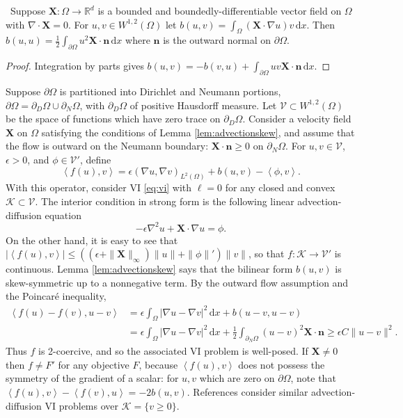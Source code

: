 \documentclass[review,hidelinks,onefignum,onetabnum]{siamart220329}
\newcommand{\eps}{\epsilon}
\newcommand{\RR}{\mathbb{R}}
\newcommand{\grad}{\nabla}
\newcommand{\Div}{\nabla\cdot}
\newcommand{\bn}{\mathbf{n}}
\newcommand{\bX}{\mathbf{X}}
\newcommand{\cK}{\mathcal{K}}
\newcommand{\cV}{\mathcal{V}}
\newcommand{\ip}[2]{\left<#1,#2\right>}
\newcommand{\dx}{\, \mathrm{d}x}
\begin{document}
\begin{lemma}  \label{lem:advectionskew}  \cite{Elmanetal2014}\,  Suppose $\bX :\Omega \to \RR^d$ is a bounded and boundedly-differentiable vector field on $\Omega$ with $\Div \bX=0$.  For $u,v \in W^{1,2}(\Omega)$ let $b(u,v) = \int_\Omega (\bX \cdot \grad u) v\dx$.  Then $b(u,u) = \frac{1}{2} \int_{\partial \Omega} u^2 \bX\cdot \bn\dx$ where $\bn$ is the outward normal on $\partial \Omega$.
\end{lemma}

\begin{proof}
Integration by parts gives $b(u,v) = - b(v,u) + \int_{\partial \Omega} uv \bX\cdot \bn\dx$.
\end{proof}

\begin{example}  \label{ex:advectiondiffusion}  Suppose $\partial\Omega$ is partitioned into Dirichlet and Neumann portions, $\partial\Omega = \partial_D\Omega \cup \partial_N\Omega$, with $\partial_D\Omega$ of positive Hausdorff measure.  Let $\cV \subset W^{1,2}(\Omega)$ be the space of functions which have zero trace on $\partial_D\Omega$.  Consider a velocity field $\bX$ on $\Omega$ satisfying the conditions of Lemma \ref{lem:advectionskew}, and assume that the flow is outward on the Neumann boundary: $\bX \cdot \bn \ge 0$ on $\partial_N\Omega$.  For $u,v \in \cV$, $\eps>0$, and $\phi \in \cV'$, define
\begin{equation}
\ip{f(u)}{v} = \eps \left(\grad u, \grad v\right)_{L^2(\Omega)} + b(u,v) - \ip{\phi}{v}. \label{eq:advectiondiffusion}
\end{equation}
With this operator, consider VI \eqref{eq:vi} with $\ell = 0$ for any closed and convex $\cK \subset \cV$. The interior condition in strong form is the following linear advection-diffusion equation
\begin{equation}
-\eps \grad^2 u + \bX\cdot \grad u = \phi.
\label{eq:advectiondiffusionstrong}
\end{equation}
On the other hand, it is easy to see that $|\!\ip{f(u)}{v}\!| \le \left((\eps + \|\bX\|_\infty) \|u\| + \|\phi\|'\right) \|v\|$, so that $f:\cK \to \cV'$ is continuous.  Lemma \ref{lem:advectionskew} says that the bilinear form $b(u,v)$ is skew-symmetric up to a nonnegative term.  By the outward flow assumption and the Poincar\'e inequality,
\begin{align*}
\ip{f(u)-f(v)}{u-v} &= \eps \int_\Omega |\grad u - \grad v|^2\dx + b(u-v,u-v) \\
                    &= \eps \int_\Omega |\grad u - \grad v|^2\dx + \frac{1}{2} \int_{\partial_N\Omega} (u-v)^2 \bX\cdot\bn \ge \eps C \|u-v\|^2.
\end{align*}
Thus $f$ is 2-coercive, and so the associated VI problem is well-posed. If $\bX \ne 0$ then $f\ne F'$ for any objective $F$, because $\ip{f(u)}{v}$ does not possess the symmetry of the gradient of a scalar: for $u,v$ which are zero on $\partial \Omega$, note that $\ip{f(u)}{v} - \ip{f(v)}{u} = -2 b(u,v)$.  References \cite{Bueler2021conservation,ChangNakshatrala2017} consider similar advection-diffusion VI problems over $\cK = \{v\ge 0\}$. \end{example}
\end{document}
